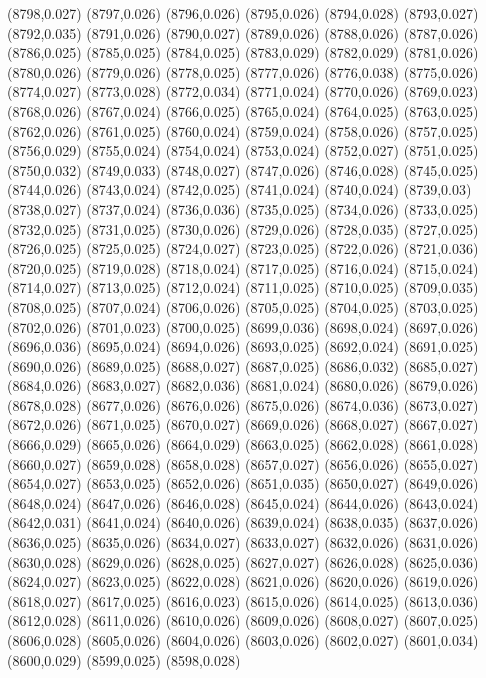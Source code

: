 (8798,0.027)
(8797,0.026)
(8796,0.026)
(8795,0.026)
(8794,0.028)
(8793,0.027)
(8792,0.035)
(8791,0.026)
(8790,0.027)
(8789,0.026)
(8788,0.026)
(8787,0.026)
(8786,0.025)
(8785,0.025)
(8784,0.025)
(8783,0.029)
(8782,0.029)
(8781,0.026)
(8780,0.026)
(8779,0.026)
(8778,0.025)
(8777,0.026)
(8776,0.038)
(8775,0.026)
(8774,0.027)
(8773,0.028)
(8772,0.034)
(8771,0.024)
(8770,0.026)
(8769,0.023)
(8768,0.026)
(8767,0.024)
(8766,0.025)
(8765,0.024)
(8764,0.025)
(8763,0.025)
(8762,0.026)
(8761,0.025)
(8760,0.024)
(8759,0.024)
(8758,0.026)
(8757,0.025)
(8756,0.029)
(8755,0.024)
(8754,0.024)
(8753,0.024)
(8752,0.027)
(8751,0.025)
(8750,0.032)
(8749,0.033)
(8748,0.027)
(8747,0.026)
(8746,0.028)
(8745,0.025)
(8744,0.026)
(8743,0.024)
(8742,0.025)
(8741,0.024)
(8740,0.024)
(8739,0.03)
(8738,0.027)
(8737,0.024)
(8736,0.036)
(8735,0.025)
(8734,0.026)
(8733,0.025)
(8732,0.025)
(8731,0.025)
(8730,0.026)
(8729,0.026)
(8728,0.035)
(8727,0.025)
(8726,0.025)
(8725,0.025)
(8724,0.027)
(8723,0.025)
(8722,0.026)
(8721,0.036)
(8720,0.025)
(8719,0.028)
(8718,0.024)
(8717,0.025)
(8716,0.024)
(8715,0.024)
(8714,0.027)
(8713,0.025)
(8712,0.024)
(8711,0.025)
(8710,0.025)
(8709,0.035)
(8708,0.025)
(8707,0.024)
(8706,0.026)
(8705,0.025)
(8704,0.025)
(8703,0.025)
(8702,0.026)
(8701,0.023)
(8700,0.025)
(8699,0.036)
(8698,0.024)
(8697,0.026)
(8696,0.036)
(8695,0.024)
(8694,0.026)
(8693,0.025)
(8692,0.024)
(8691,0.025)
(8690,0.026)
(8689,0.025)
(8688,0.027)
(8687,0.025)
(8686,0.032)
(8685,0.027)
(8684,0.026)
(8683,0.027)
(8682,0.036)
(8681,0.024)
(8680,0.026)
(8679,0.026)
(8678,0.028)
(8677,0.026)
(8676,0.026)
(8675,0.026)
(8674,0.036)
(8673,0.027)
(8672,0.026)
(8671,0.025)
(8670,0.027)
(8669,0.026)
(8668,0.027)
(8667,0.027)
(8666,0.029)
(8665,0.026)
(8664,0.029)
(8663,0.025)
(8662,0.028)
(8661,0.028)
(8660,0.027)
(8659,0.028)
(8658,0.028)
(8657,0.027)
(8656,0.026)
(8655,0.027)
(8654,0.027)
(8653,0.025)
(8652,0.026)
(8651,0.035)
(8650,0.027)
(8649,0.026)
(8648,0.024)
(8647,0.026)
(8646,0.028)
(8645,0.024)
(8644,0.026)
(8643,0.024)
(8642,0.031)
(8641,0.024)
(8640,0.026)
(8639,0.024)
(8638,0.035)
(8637,0.026)
(8636,0.025)
(8635,0.026)
(8634,0.027)
(8633,0.027)
(8632,0.026)
(8631,0.026)
(8630,0.028)
(8629,0.026)
(8628,0.025)
(8627,0.027)
(8626,0.028)
(8625,0.036)
(8624,0.027)
(8623,0.025)
(8622,0.028)
(8621,0.026)
(8620,0.026)
(8619,0.026)
(8618,0.027)
(8617,0.025)
(8616,0.023)
(8615,0.026)
(8614,0.025)
(8613,0.036)
(8612,0.028)
(8611,0.026)
(8610,0.026)
(8609,0.026)
(8608,0.027)
(8607,0.025)
(8606,0.028)
(8605,0.026)
(8604,0.026)
(8603,0.026)
(8602,0.027)
(8601,0.034)
(8600,0.029)
(8599,0.025)
(8598,0.028)
